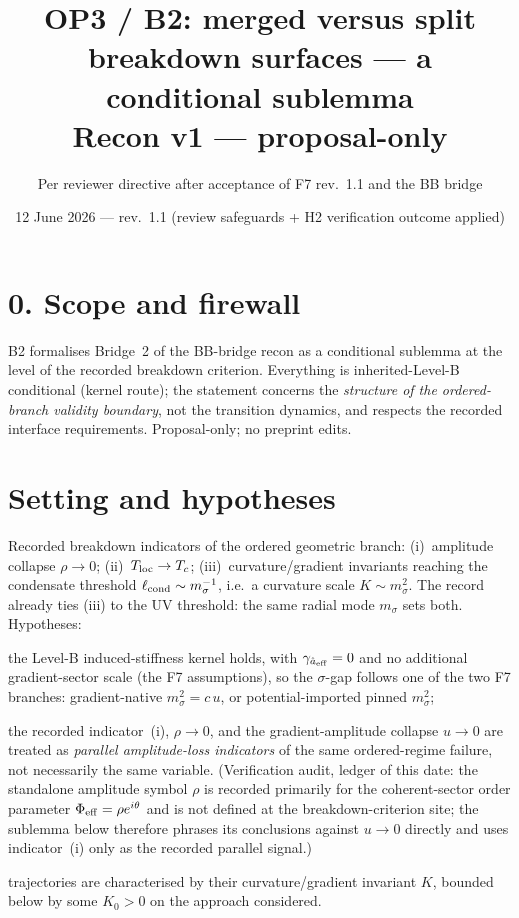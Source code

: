 \documentclass[11pt,a4paper]{article}
\title{\textbf{OP3 / B2: merged versus split breakdown surfaces ---
a conditional sublemma}\\\large Recon v1 --- proposal-only}
\author{Per reviewer directive after acceptance of F7 rev.~1.1 and the BB
bridge}
\date{12 June 2026 --- rev.~1.1 (review safeguards + H2 verification
outcome applied)}
\begin{document}
\maketitle

\section*{0. Scope and firewall}
B2 formalises Bridge~2 of the BB-bridge recon as a conditional sublemma at
the level of the recorded breakdown criterion. Everything is inherited-Level-B
conditional (kernel route); the statement concerns the \emph{structure of the
ordered-branch validity boundary}, not the transition dynamics, and respects
the recorded interface requirements. Proposal-only; no preprint edits.

\section{Setting and hypotheses}
Recorded breakdown indicators of the ordered geometric branch:
(i)~amplitude collapse $\rho\to0$;
(ii)~$T_{\rm loc}\to T_c$;
(iii)~curvature/gradient invariants reaching the condensate threshold
$\ell_{\rm cond}\sim m_\sigma^{-1}$, i.e.\ a curvature scale
$K\sim m_\sigma^{2}$.
The record already ties (iii) to the UV threshold: the same radial mode
$m_\sigma$ sets both. Hypotheses:
\begin{description}[leftmargin=2.0em,itemsep=2pt]
\item[(H1)] the Level-B induced-stiffness kernel holds, with
$\gamma_{\hat a_{\rm eff}}=0$ and no additional gradient-sector scale (the
F7 assumptions), so the $\sigma$-gap follows one of the two F7 branches:
gradient-native $m_\sigma^2=c\,u$, or potential-imported pinned $m_\sigma^2$;
\item[(H2)] the recorded indicator~(i), $\rho\to0$, and the
gradient-amplitude collapse $u\to0$ are treated as \emph{parallel
amplitude-loss indicators} of the same ordered-regime failure, not
necessarily the same variable. (Verification audit, ledger of this date:
the standalone amplitude symbol $\rho$ is recorded primarily for the
coherent-sector order parameter $\Phi_{\rm eff}=\rho e^{i\theta}$ and is
not defined at the breakdown-criterion site; the sublemma below therefore
phrases its conclusions against $u\to0$ directly and uses indicator~(i)
only as the recorded parallel signal.)
\item[(H3)] trajectories are characterised by their curvature/gradient
invariant $K$, bounded below by some $K_0>0$ on the approach considered.
\end{description}
\end{document}
